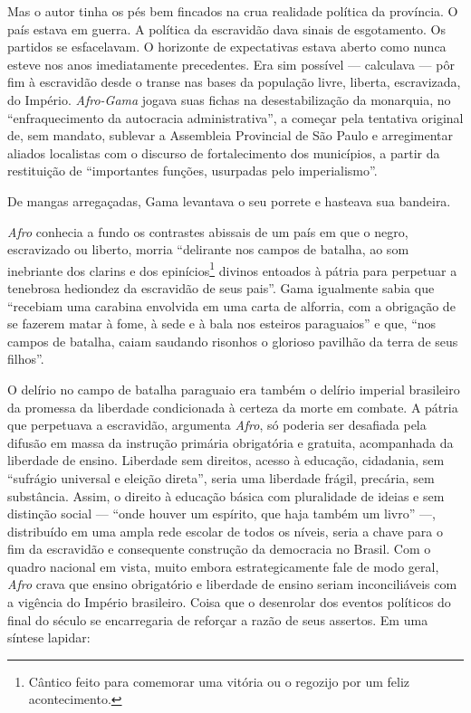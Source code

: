 Mas o autor tinha os pés bem fincados na crua realidade política da
província. O país estava em guerra. A política da escravidão dava sinais
de esgotamento. Os partidos se esfacelavam. O horizonte de expectativas
estava aberto como nunca esteve nos anos imediatamente precedentes. Era
sim possível --- calculava --- pôr fim à escravidão desde o transe nas
bases da população livre, liberta, escravizada, do Império.
\emph{Afro-Gama} jogava suas fichas na desestabilização da monarquia, no
``enfraquecimento da autocracia administrativa'', a começar pela tentativa
original de, sem mandato, sublevar a Assembleia Provincial de São Paulo
e arregimentar aliados localistas com o discurso de fortalecimento dos
municípios, a partir da restituição de ``importantes funções, usurpadas
pelo imperialismo''.

De mangas arregaçadas, Gama levantava o seu porrete e hasteava sua
bandeira.

\emph{Afro} conhecia a fundo os contrastes abissais de um país em que o
negro, escravizado ou liberto, morria ``delirante nos campos de batalha,
ao som inebriante dos clarins e dos epinícios\footnote{Cântico feito
  para comemorar uma vitória ou o regozijo por um feliz acontecimento.}
divinos entoados à pátria para perpetuar a tenebrosa hediondez da
escravidão de seus pais''. Gama igualmente sabia que ``recebiam uma
carabina envolvida em uma carta de alforria, com a obrigação de se
fazerem matar à fome, à sede e à bala nos esteiros paraguaios'' e que,
``nos campos de batalha, caiam saudando risonhos o glorioso pavilhão da
terra de seus filhos''.

O delírio no campo de batalha paraguaio era também o delírio imperial
brasileiro da promessa da liberdade condicionada à certeza da morte em
combate. A pátria que perpetuava a escravidão, argumenta \emph{Afro}, só
poderia ser desafiada pela difusão em massa da instrução primária
obrigatória e gratuita, acompanhada da liberdade de ensino. Liberdade
sem direitos, acesso à educação, cidadania, sem ``sufrágio universal e
eleição direta'', seria uma liberdade frágil, precária, sem substância.
Assim, o direito à educação básica com pluralidade de ideias e sem
distinção social --- ``onde houver um espírito, que haja também um livro''
---, distribuído em uma ampla rede escolar de todos os níveis, seria a
chave para o fim da escravidão e consequente construção da democracia no
Brasil. Com o quadro nacional em vista, muito embora estrategicamente
fale de modo geral, \emph{Afro} crava que ensino obrigatório e liberdade
de ensino seriam inconciliáveis com a vigência do Império brasileiro.
Coisa que o desenrolar dos eventos políticos do final do século se
encarregaria de reforçar a razão de seus assertos. Em uma síntese
lapidar:

